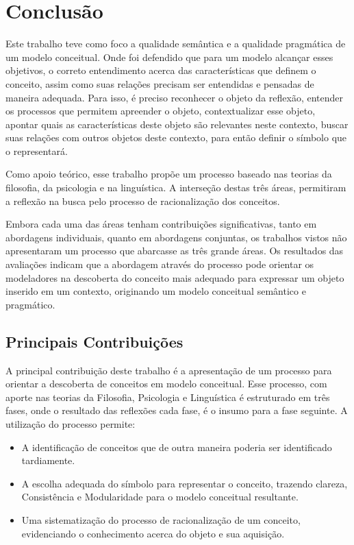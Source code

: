 

\chapter{\hspace*{3pt} Conclusão}
\label{chap:conclusao}

Este trabalho teve como foco a qualidade semântica e a qualidade pragmática de um modelo conceitual. Onde foi defendido que para um modelo alcançar esses objetivos, o correto entendimento acerca das características que definem o conceito, assim como suas relações precisam ser entendidas e pensadas de maneira adequada. Para isso, é preciso reconhecer o objeto da reflexão, entender os processos que permitem apreender o objeto, contextualizar esse objeto, apontar quais as características deste objeto são relevantes neste contexto, buscar suas relações com outros objetos deste contexto, para então definir o símbolo que o representará.

Como apoio teórico, esse trabalho propõe um processo baseado nas teorias da filosofia, da psicologia e na linguística. A interseção destas três áreas, permitiram a reflexão na busca pelo processo de racionalização dos conceitos.

Embora cada uma das áreas tenham contribuições significativas, tanto em abordagens individuais, quanto em abordagens conjuntas, os trabalhos vistos não apresentaram um processo que abarcasse as três grande áreas. Os resultados das avaliações indicam que a abordagem através do processo pode orientar os modeladores na descoberta do conceito mais adequado para expressar um objeto inserido em um contexto, originando um modelo conceitual semântico e pragmático.

\section{\hspace*{3pt} Principais Contribuições}
\label{sec:contribuicoes}

A principal contribuição deste trabalho é a apresentação de um processo para orientar a descoberta de conceitos em modelo conceitual. Esse processo, com aporte nas teorias da Filosofia, Psicologia e Linguística é estruturado em três fases, onde o resultado das reflexões cada fase, é o insumo para a fase seguinte. A utilização do processo permite:

\begin{itemize}
\item A identificação de conceitos que de outra maneira poderia ser identificado tardiamente.%
\item A escolha adequada do símbolo para representar o conceito, trazendo clareza, Consistência e Modularidade para o modelo conceitual resultante.
\item Uma sistematização do processo de racionalização de um conceito, evidenciando o conhecimento acerca do objeto e sua aquisição.
\end{itemize}


